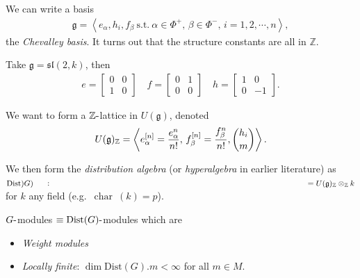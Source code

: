 We can write a basis
\begin{align*}   {\mathfrak{g}}= \left\langle{e_\alpha, h_i, f_\beta ~{\text{s.t.}}~\alpha\in\Phi^+,\, \beta\in\Phi^-,\, i = 1,2,\cdots,n}\right\rangle ,\end{align*}
the \emph{Chevalley basis}. It turns out that the structure constants
are all in \({\mathbb{Z}}\).

\begin{example}

\begin{example}

Take \({\mathfrak{g}}= {\mathfrak{sl}}(2, k)\), then
\begin{align*}   e = \begin{bmatrix} 0 & 0 \\ 1 & 0 \end{bmatrix} \quad  f = \begin{bmatrix} 0 & 1 \\ 0 & 0 \end{bmatrix} \quad h = \begin{bmatrix} 1 & 0 \\ 0 & -1 \end{bmatrix} .\end{align*}

\end{example}

\end{example}

We want to form a \({\mathbb{Z}}{\hbox{-}}\)lattice in
\(U({\mathfrak{g}})\), denoted
\begin{align*}   U({\mathfrak{g}})_{\mathbb{Z}} = \left\langle{ e_\alpha^{[n]} = {e_\alpha^n \over n!},\, f_\beta^{[n]} = {f_\beta^n \over n!}, {h_i \choose m} }\right\rangle .\end{align*}

We then form the \emph{distribution algebra} (or \emph{hyperalgebra} in
earlier literature) as
\(\mathrm{Dist})G) \mathrel{\vcenter{:}}= U({\mathfrak{g}})_{\mathbb{Z}}\otimes_{\mathbb{Z}}k\)
for \(k\) any field (e.g.~\(\operatorname{char}~(k) = p\)).

\begin{theorem}[?]

\begin{theorem}[?]

\(G{\hbox{-}}\)modules \(\equiv \mathrm{Dist}(G){\hbox{-}}\)modules
which are

\begin{itemize}
\tightlist
\item
  \emph{Weight modules}
\item
  \emph{Locally finite}: \(\dim \mathrm{Dist}(G).m < \infty\) for all
  \(m\in M\).
\end{itemize}

\end{theorem}

\end{theorem}

